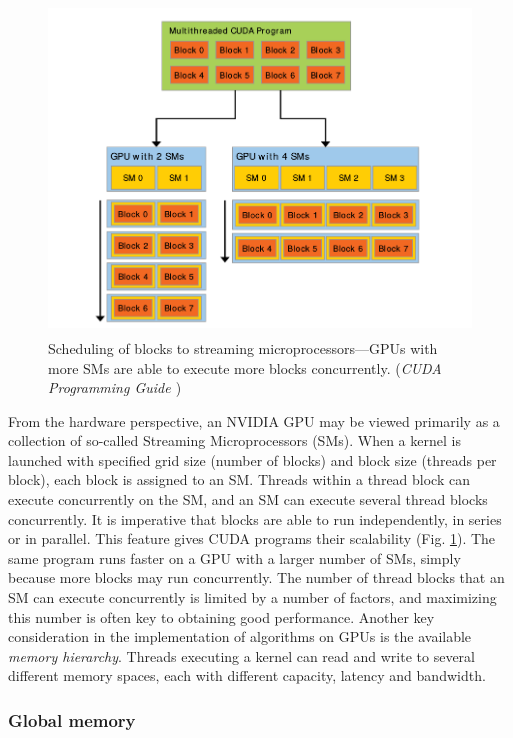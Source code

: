 \begin{figure}
\begin{center}
\includegraphics[height=250pt]{img/gpu-scaling.png}
\end{center}
\caption{Scheduling of blocks to streaming microprocessors---GPUs
    with more SMs are able to execute more blocks concurrently.
(\emph{CUDA Programming Guide \cite{CUDAProgrammingGuide}})}
\label{fig:gpu-scaling}
\end{figure}

From the hardware perspective,
an NVIDIA GPU may be viewed primarily as
a collection of so-called Streaming Microprocessors (SMs).
When a kernel is launched with specified
grid size (number of blocks)
and block size (threads per block),
each block is assigned to an SM.
Threads within a thread block can execute concurrently on the SM,
and an SM can execute several thread blocks concurrently.
It is imperative that blocks are able to run
independently, in series or in parallel.
This feature gives CUDA programs
their scalability (Fig. \ref{fig:gpu-scaling}).
The same program runs faster on a GPU with a larger number
of SMs, simply because more blocks may run concurrently.
The number of thread blocks that an
SM can execute concurrently
is limited by a number of factors,
and maximizing this number is often
key to obtaining good performance.
Another key consideration in the implementation
of algorithms on GPUs is the
available \emph{memory hierarchy}.
Threads executing a kernel can read and write
to several different memory spaces,
each with different capacity, latency and bandwidth.

\subsubsection{Global memory}

